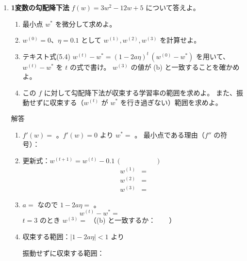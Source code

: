 \documentclass[a4paper,dvipdfmx]{jsarticle}
\newcommand{\提出期限}{2026年10月26日（月）}
\newcommand{\学籍番号}{0000000}
\newcommand{\氏名}{氏名を書く}
\newcommand{\提出日}{2026年10月26日}
\newenvironment{answer}{\begin{itembox}[l]{解答}}{\end{itembox}}
\begin{document}
\begin{enumerate}

  \item \textbf{1変数の勾配降下法}\quad
    $f(w) = 3w^2 - 12w + 5$ について答えよ。
    \begin{enumerate}
      \item 最小点 $w^*$ を微分して求めよ。
      \item $w^{(0)} = 0$、$\eta = 0.1$ として $w^{(1)}, w^{(2)}, w^{(3)}$ を計算せよ。
      \item テキスト式(5.4) $w^{(t)} - w^* = (1 - 2a\eta)^t\,(w^{(0)} - w^*)$ を用いて、$w^{(t)} - w^*$ を $t$ の式で書け。
        $w^{(3)}$ の値が (b) と一致することを確かめよ。
      \item この $f$ に対して勾配降下法が収束する学習率の範囲を求めよ。
        また、振動せずに収束する（$w^{(t)}$ が $w^*$ を行き過ぎない）範囲を求めよ。
    \end{enumerate}
    \begin{answer}
      \begin{enumerate}
        \item $f'(w) = $ \phantom{XXXXXX}。$f'(w) = 0$ より $w^* = $ \phantom{XXX}。
          最小点である理由（$f''$ の符号）：
        \item 更新式：$w^{(t+1)} = w^{(t)} - 0.1\,(\phantom{XXXXXX})$
          \begin{align*}
            w^{(1)} &= \\
            w^{(2)} &= \\
            w^{(3)} &=
          \end{align*}
        \item $a = $ \phantom{XX} なので $1 - 2a\eta = $ \phantom{XXX}。
          \begin{equation*}
            w^{(t)} - w^* = \phantom{XXXXXXXXXXXX}
          \end{equation*}
          $t = 3$ のとき $w^{(3)} = $ \phantom{XXXXXX}（(b) と一致するか：　　）
        \item 収束する範囲：$|1 - 2a\eta| < 1$ より \phantom{XXXXXXXXXX}
          \vspace{6mm}

          振動せずに収束する範囲：\phantom{XXXXXXXXXX}
          \vspace{6mm}
      \end{enumerate}
    \end{answer}


\end{enumerate}
\end{document}
